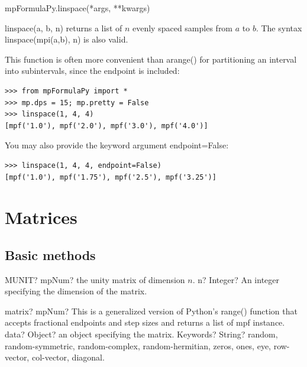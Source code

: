 mpFormulaPy.linspace(*args, **kwargs)

\vpara
linspace(a, b, n) returns a list of $n$ evenly spaced samples from $a$ to $b$. The syntax linspace(mpi(a,b), n) is also valid.

\vpara
This function is often more convenient than arange() for partitioning an interval into subintervals, since the endpoint is included:

\begin{lstlisting}
>>> from mpFormulaPy import *
>>> mp.dps = 15; mp.pretty = False
>>> linspace(1, 4, 4)
[mpf('1.0'), mpf('2.0'), mpf('3.0'), mpf('4.0')]
\end{lstlisting}

You may also provide the keyword argument endpoint=False:

\begin{lstlisting}
>>> linspace(1, 4, 4, endpoint=False)
[mpf('1.0'), mpf('1.75'), mpf('2.5'), mpf('3.25')]
\end{lstlisting}



\newpage
\section{Matrices}

\subsection{Basic methods}




\begin{mpFunctionsExtract}
	\mpWorksheetFunctionOneNotImplemented
	{MUNIT? mpNum? the unity matrix of dimension $n$.}
	{n? Integer? An integer specifying the dimension of the matrix.}
\end{mpFunctionsExtract}




\begin{mpFunctionsExtract}
	\mpFunctionTwo
	{matrix? mpNum?  This is a generalized version of Python's range() function that accepts fractional endpoints and step sizes and returns a list of mpf instance.}
	{data? Object? an object specifying the matrix.}
	{Keywords? String? random, random-symmetric, random-complex, random-hermitian, zeros, ones, eye, row-vector, col-vector, diagonal.}		
\end{mpFunctionsExtract}





